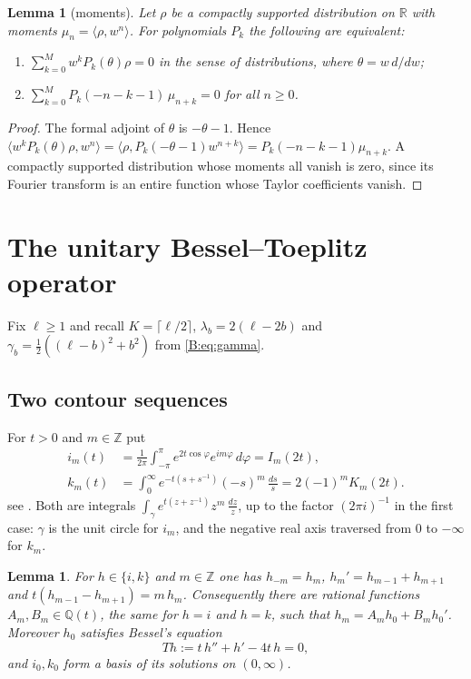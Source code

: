 \documentclass[11pt,a4paper]{article}
\newtheorem{lemma}[theorem]{Lemma}
\theoremstyle{definition}
\theoremstyle{remark}
\newcommand{\Q}{\mathbb Q}
\newcommand{\Z}{\mathbb Z}
\newcommand{\R}{\mathbb R}
\newcommand{\cl}[1]{\lceil #1\rceil}
\numberwithin{equation}{section}
\begin{document}
\begin{lemma}[moments]\label{B:lem:dict-mom}
Let $\rho$ be a compactly supported distribution on $\R$ with moments $\mu_n=\langle\rho,w^n\rangle$. For polynomials $P_k$ the following are equivalent:
\begin{enumerate}
\item[(i)] $\sum_{k=0}^{M}w^kP_k(\theta)\rho=0$ in the sense of distributions, where $\theta=w\,d/dw$;
\item[(ii)] $\sum_{k=0}^{M}P_k(-n-k-1)\,\mu_{n+k}=0$ for all $n\ge0$.
\end{enumerate}
\end{lemma}

\begin{proof}
The formal adjoint of $\theta$ is $-\theta-1$. Hence $\langle w^kP_k(\theta)\rho,w^n\rangle=\langle\rho,P_k(-\theta-1)w^{n+k}\rangle=P_k(-n-k-1)\mu_{n+k}$. A compactly supported distribution whose moments all vanish is zero, since its Fourier transform is an entire function whose Taylor coefficients vanish.
\end{proof}

\section{The unitary Bessel--Toeplitz operator}\label{B:sec:unitary}

Fix $\ell\ge1$ and recall $K=\cl{\ell/2}$, $\lambda_b=2(\ell-2b)$ and $\gamma_b=\frac12((\ell-b)^2+b^2)$ from \eqref{B:eq:gamma}.

\subsection{Two contour sequences}
For $t>0$ and $m\in\Z$ put
\[
\begin{aligned}
i_m(t)&=\frac1{2\pi}\int_{-\pi}^{\pi}e^{2t\cos\varphi}e^{im\varphi}\,d\varphi=I_m(2t),\\
k_m(t)&=\int_0^\infty e^{-t(s+s^{-1})}(-s)^m\,\frac{ds}{s}=2(-1)^mK_m(2t).
\end{aligned}
\]
see \cite[10.32.3, 10.32.10]{DLMF}. Both are integrals $\int_\gamma e^{t(z+z^{-1})}z^m\,\frac{dz}{z}$, up to the factor $(2\pi i)^{-1}$ in the first case: $\gamma$ is the unit circle for $i_m$, and the negative real axis traversed from $0$ to $-\infty$ for $k_m$.

\begin{lemma}\label{B:lem:seq}
For $h\in\{i,k\}$ and $m\in\Z$ one has $h_{-m}=h_m$, $h_m'=h_{m-1}+h_{m+1}$ and $t(h_{m-1}-h_{m+1})=m\,h_m$. Consequently there are rational functions $A_m,B_m\in\Q(t)$, the same for $h=i$ and $h=k$, such that $h_m=A_mh_0+B_mh_0'$. Moreover $h_0$ satisfies Bessel's equation
\begin{equation}\label{B:eq:T}
Th:=t\,h''+h'-4t\,h=0,
\end{equation}
and $i_0,k_0$ form a basis of its solutions on $(0,\infty)$.
\end{lemma}
\end{document}

